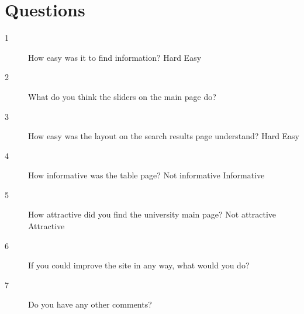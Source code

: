 \documentclass[11pt]{article} %
\begin{document}
\section{Questions}\label{sec:quest}
\begin{description}
    \item[1] How easy was it to find information? \newline\newline
    Hard \quad{}\quad\quad{}\quad\quad{} \quad\quad{} \quad\quad{} \quad\quad{}\quad\quad Easy
    \newline
    \item[2] What do you think the sliders on the main page do? \newline\newline\newline
    \item[3] How easy was the layout on the search results page understand? \newline\newline
Hard \quad{}\quad\quad{}\quad\quad{} \quad\quad{} \quad\quad{} \quad\quad{}\quad\quad Easy\newline
    \item[4] How informative was the table page? \newline \newline  
Not informative \quad{}\quad\quad{}\quad\quad{} \quad\quad{} \quad\quad{} \quad\quad{}\quad\quad Informative\newline
    \item[5] How attractive did you find the university main page? \newline\newline Not attractive \quad{}\quad\quad{}\quad\quad{} \quad\quad{} \quad\quad{} \quad\quad{}\quad\quad Attractive\newline
    \item[6] If you could improve the site in any way, what would you do? \newline\newline\newline
    \item[7] Do you have any other comments?

\end{description}
\end{document}
